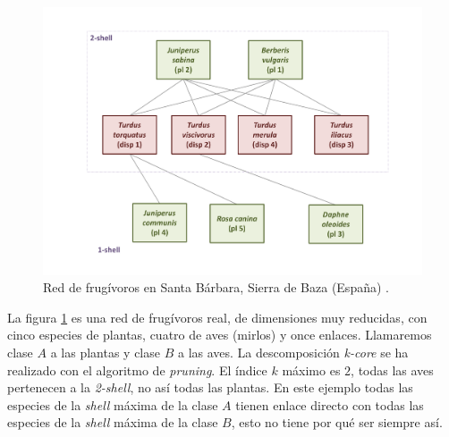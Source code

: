 \begin{figure}[h!]
\centering
\includegraphics[scale=0.5]{Figures/ESTATICA_SD_030_example_network.pdf}
\caption {Red de frugívoros en Santa Bárbara, Sierra de Baza (España) \cite{jordano1993geographical}.}
\label{fig:ESTATICA_red_example}
\end{figure}

%

La figura \ref{fig:ESTATICA_red_example} es una red de frugívoros real, de dimensiones muy reducidas, con cinco especies de plantas, cuatro de aves (mirlos) y once enlaces. Llamaremos clase $A$ a las plantas y clase $B$ a las aves. La descomposición \textit{k-core} se ha realizado con el algoritmo de \textit{pruning}. El índice $k$ máximo es $2$, todas las aves pertenecen a la \textit{2-shell}, no así todas las plantas. En este ejemplo todas las especies de la \textit{shell} máxima de la clase $A$ tienen enlace directo con todas las especies de la \textit{shell} máxima de la clase $B$, esto no tiene por qué ser siempre así. 


